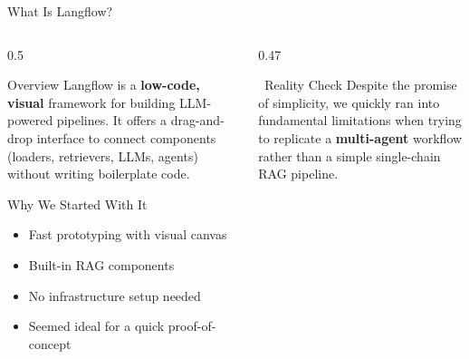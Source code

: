 \documentclass[aspectratio=169]{beamer}
\begin{document}
\begin{frame}{What Is Langflow?}
  \begin{columns}[T]
    \begin{column}{0.5\textwidth}
      \begin{block}{Overview}
        \small
        Langflow is a \textbf{low-code, visual} framework for building LLM-powered pipelines. It offers a drag-and-drop interface to connect components (loaders, retrievers, LLMs, agents) without writing boilerplate code.
      \end{block}
      \vspace{0.3cm}
      \begin{block}{Why We Started With It}
        \small
        \begin{itemize}
          \item Fast prototyping with visual canvas
          \item Built-in RAG components
          \item No infrastructure setup needed
          \item Seemed ideal for a quick proof-of-concept
        \end{itemize}
      \end{block}
    \end{column}
    \begin{column}{0.47\textwidth}
      \begin{alertblock}{\faExclamationTriangle\ Reality Check}
        \small
        Despite the promise of simplicity, we quickly ran into fundamental limitations when trying to replicate a \textbf{multi-agent} workflow rather than a simple single-chain RAG pipeline.
      \end{alertblock}
    \end{column}
  \end{columns}
\end{frame}
\end{document}
